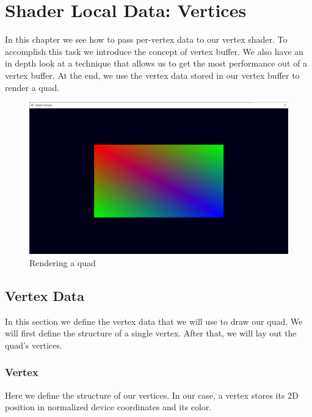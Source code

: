 \chapter{Shader Local Data: Vertices}
\label{chap:Vertices}

In this chapter we see how to pass per-vertex data to our vertex shader.
To accomplish this task we introduce the concept of vertex buffer.
We also have an in depth look at a technique that allows us to get
the most performance out of a vertex buffer.
At the end, we use the vertex data stored in our vertex buffer to render a quad.

\begin{figure}[ht]
    \centering
    \includegraphics[scale=0.20]{images/ChVertices/RenderQuad.png}
    \caption{Rendering a quad}
    \label{fig::RenderQuad}
\end{figure}

\section{Vertex Data}

In this section we define the vertex data that we will use to draw our quad.
We will first define the structure of a single vertex.
After that, we will lay out the quad's vertices.

\subsection{Vertex}

Here we define the structure of our vertices.
In our case, a vertex stores its 2D position in normalized device coordinates
and its color.

\begin{minipage}{\linewidth}{\noindent}
    
\end{minipage}

